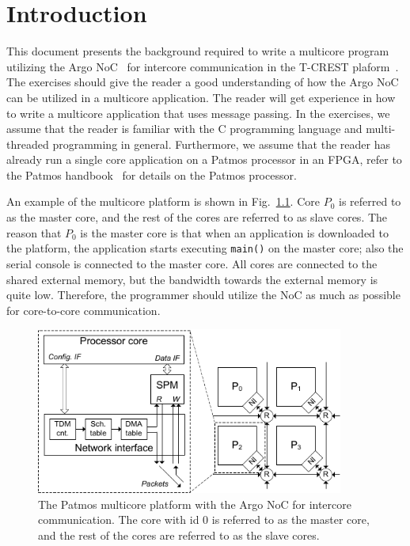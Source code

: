 \documentclass[a4paper,fontsize=10pt,twoside,DIV15,BCOR12mm,headinclude=true,footinclude=false,pagesize,bibtotoc]{scrbook}
\newcommand{\code}[1]{{\texttt{#1}}}
\begin{document}

\mainmatter

\chapter{Introduction}

This document presents the background required to write a multicore program utilizing the Argo NoC~\cite{t-crest:argo:tvlsi2015} for intercore communication in the T-CREST plaform~\cite{t-crest:2015}.
The exercises should give the reader a good understanding of how the Argo NoC can be utilized in a multicore application.
The reader will get experience in how to write a multicore application that uses message passing.
In the exercises, we assume that the reader is familiar with the C programming language and multi-threaded programming in general.
Furthermore, we assume that the reader has already run a single core application on a Patmos processor in an FPGA, refer to the Patmos handbook~\cite{patmos:handbook} for details on the Patmos processor.

An example of the multicore platform is shown in Fig.~\ref{fig:mc-patmos}. Core $P_0$ is referred to as the master core, and the rest of the cores are referred to as slave cores. The reason that $P_0$ is the master core is that when an application is downloaded to the platform, the application starts executing \code{main()} on the master core; also the serial console  is connected to the master core. All cores are connected to the shared external memory, but the bandwidth towards the external memory is quite low.
Therefore, the programmer should utilize the NoC as much as possible for core-to-core communication.
\begin{figure}[h]
\centering
\includegraphics[width=0.9\textwidth]{fig/MultiCore.pdf}
\caption{The Patmos multicore platform with the Argo NoC for intercore communication.
The core with id 0 is referred to as the master core, and the rest of the cores are referred to as the slave cores.}
\label{fig:mc-patmos}
\end{figure}
\end{document}
